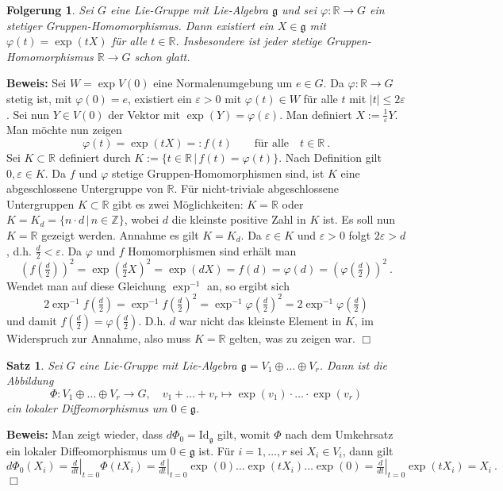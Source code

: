 \documentclass[12pt,a4paper]{article}
\def\R{\mathbb{R}}
\def\Z{\mathbb{Z}}
\def\g{\mathfrak{g}}
\def\Id{\mathrm{Id}}
\newtheorem{Satz}[Lemma]{Satz}
\newtheorem{Folgerung}[Lemma]{Folgerung}
\def\proof{\noindent\textbf{Beweis:}\quad}
\def\qed{\quad\hfill\ensuremath{\Box}}
\begin{document}
\bigskip

\begin{Folgerung}\label{stetig}
Sei $G$ eine Lie-Gruppe mit Lie-Algebra $\g$ und sei $\varphi: \R \rightarrow G$ ein stetiger Gruppen-Homomorphismus.
Dann existiert ein $X\in \g$ mit $\varphi(t) = \exp (tX)$ f\"ur alle $t\in \R$. Insbesondere ist jeder stetige
Gruppen-Homomorphismus $\R \rightarrow G$ schon glatt.
\end{Folgerung}
\proof
Sei $W = \exp V(0)$ eine Normalenumgebung um $e\in G$. Da $\varphi : \R \rightarrow G$ stetig ist, mit $\varphi(0)=e$,
existiert ein $\varepsilon >0$ mit $\varphi(t) \in W$ f\"ur alle $t$ mit $|t| \le 2 \varepsilon$. Sei nun $Y \in V(0)$
der Vektor mit $\exp(Y) = \varphi(\varepsilon)$. Man definiert $X:= \frac1\varepsilon Y$. Man m\"ochte nun zeigen
$$
\varphi(t) = \exp (tX) =: f(t) \qquad \mbox{f\"ur alle} \quad t \in \R \ .
$$
Sei $K \subset \R$ definiert durch $K:= \{ t \in \R \, |\, f(t) = \varphi(t) \}$. Nach Definition gilt
$ 0, \varepsilon \in K$. Da $f$ und $\varphi$ stetige  Gruppen-Homomorphismen sind, ist $K$ eine abgeschlossene
Untergruppe von $\R$. F\"ur nicht-triviale abgeschlossene Untergruppen  $K\subset \R$ gibt es zwei M\"oglichkeiten:
$K = \R$ oder $K = K_d = \{ n \cdot d \,|\, n \in \Z\}$, wobei $d$ die kleinste positive Zahl in $K$ ist. Es
soll nun $K= \R$ gezeigt werden. Annahme es gilt $K= K_d$. Da $\varepsilon \in K$ und $\varepsilon >0$ folgt
$2\varepsilon > d$, d.h. $\frac{d}{2} <\varepsilon$. Da $\varphi$ und $f$ Homomorphismen sind
erh\"alt man
$$
(f(\tfrac{d}{2}))^2 = \exp (\tfrac{d}{2} X)^2 = \exp (dX)=f(d) = \varphi(d) = (\varphi(\tfrac{d}{2}))^2 \ .
$$
Wendet man auf diese Gleichung $\exp^{-1}$ an, so ergibt sich
$$
2 \exp^{-1}f(\tfrac{d}{2}) = \exp^{-1} f(\tfrac{d}{2})^2 = \exp^{-1} \varphi(\tfrac{d}{2})^2   =
2\exp^{-1}\varphi(\tfrac{d}{2})
$$
und damit $f(\tfrac{d}{2}) = \varphi(\tfrac{d}{2})$. D.h. $d$ war nicht das kleinste Element in $K$, im Widerspruch
zur Annahme, also muss $K=\R$ gelten, was zu zeigen war.
\qed

\bigskip

\begin{Satz}\label{Phi}
Sei $G$ eine Lie-Gruppe mit Lie-Algebra $\g = V_1 \oplus \ldots \oplus V_r$. Dann ist die Abbildung
$$
\Phi : V_1 \oplus \ldots \oplus V_r \rightarrow G, \quad v_1 + \ldots + v_r \mapsto
\exp(v_1)\cdot \ldots \cdot \exp(v_r)
$$
ein lokaler Diffeomorphismus um $0 \in \g$.
\end{Satz}
\proof
Man zeigt wieder, dass $d\Phi_0 = \Id_{\g}$ gilt, womit $\Phi$ nach dem Umkehrsatz ein lokaler
Diffeomorphismus um $0 \in \g$ ist. F\"ur $i=1,\ldots, r$ sei $X_i \in V_i $, dann gilt
$$
d\Phi_0(X_i) = \left.\tfrac{d}{dt}\right|_{t=0} \Phi(tX_i)
=  \left.\tfrac{d}{dt}\right|_{t=0} \exp(0) \ldots \exp(tX_i) \ldots \exp(0)
=  \left.\tfrac{d}{dt}\right|_{t=0} \exp(tX_i) = X_i \ .
$$
\qed
\end{document}
